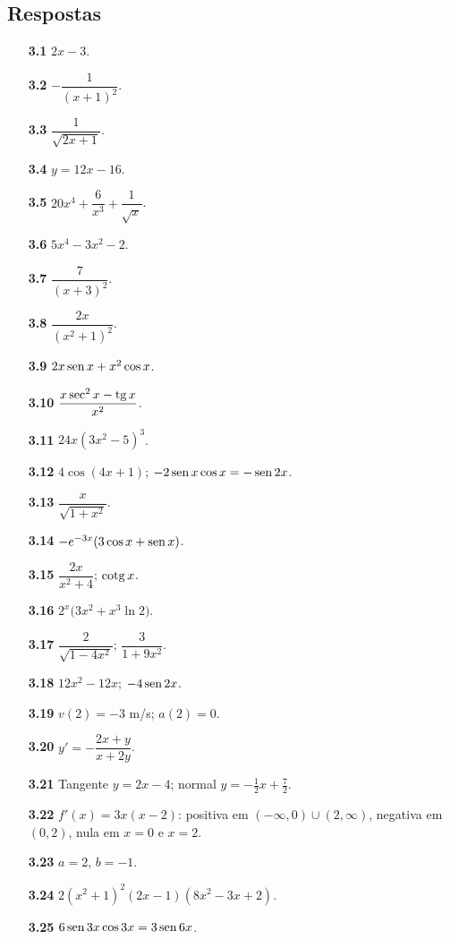 \subsection*{Respostas}
{\small\begin{multicols}{2}\raggedright
\begin{itemize}[leftmargin=2.7em,labelsep=0.5em,itemsep=1pt]
\item[\textbf{3.1}] $2x-3$.
\item[\textbf{3.2}] $-\dfrac1{(x+1)^2}$.
\item[\textbf{3.3}] $\dfrac1{\sqrt{2x+1}}$.
\item[\textbf{3.4}] $y=12x-16$.
\item[\textbf{3.5}] $20x^4+\dfrac6{x^3}+\dfrac1{\sqrt x}$.
\item[\textbf{3.6}] $5x^4-3x^2-2$.
\item[\textbf{3.7}] $\dfrac7{(x+3)^2}$.
\item[\textbf{3.8}] $\dfrac{2x}{(x^2+1)^2}$.
\item[\textbf{3.9}] $2x\operatorname{sen} x+x^2\cos x$.
\item[\textbf{3.10}] $\dfrac{x\sec^2x-\operatorname{tg} x}{x^2}$.
\item[\textbf{3.11}] $24x(3x^2-5)^3$.
\item[\textbf{3.12}] $4\cos(4x+1)$; $-2\operatorname{sen} x\cos x=-\operatorname{sen}2x$.
\item[\textbf{3.13}] $\dfrac{x}{\sqrt{1+x^2}}$.
\item[\textbf{3.14}] $-e^{-3x}(3\cos x+\operatorname{sen} x)$.
\item[\textbf{3.15}] $\dfrac{2x}{x^2+4}$; $\operatorname{cotg} x$.
\item[\textbf{3.16}] $2^x\big(3x^2+x^3\ln2\big)$.
\item[\textbf{3.17}] $\dfrac2{\sqrt{1-4x^2}}$; $\dfrac3{1+9x^2}$.
\item[\textbf{3.18}] $12x^2-12x$; $-4\operatorname{sen}2x$.
\item[\textbf{3.19}] $v(2)=-3$ m/s; $a(2)=0$.
\item[\textbf{3.20}] $y'=-\dfrac{2x+y}{x+2y}$.
\item[\textbf{3.21}] Tangente $y=2x-4$; normal $y=-\tfrac12x+\tfrac72$.
\item[\textbf{3.22}] $f'(x)=3x(x-2)$: positiva em $(-\infty,0)\cup(2,\infty)$, negativa em $(0,2)$, nula em $x=0$ e $x=2$.
\item[\textbf{3.23}] $a=2$, $b=-1$.
\item[\textbf{3.24}] $2(x^2+1)^2(2x-1)(8x^2-3x+2)$.
\item[\textbf{3.25}] $6\operatorname{sen}3x\cos3x=3\operatorname{sen}6x$.

\end{itemize}
\end{multicols}}
